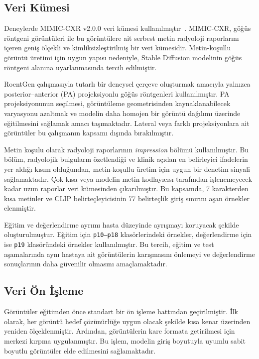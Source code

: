 \documentclass[11pt]{article}
\begin{document}
\subsection{Veri Kümesi}

Deneylerde MIMIC-CXR v2.0.0 veri kümesi kullanılmıştır~\cite{mimic}. MIMIC-CXR,
göğüs röntgeni görüntüleri ile bu görüntülere ait serbest metin radyoloji
raporlarını içeren geniş ölçekli ve kimliksizleştirilmiş bir veri kümesidir.
Metin-koşullu görüntü üretimi için uygun yapısı nedeniyle, Stable Diffusion
modelinin göğüs röntgeni alanına uyarlanmasında tercih edilmiştir.

RoentGen çalışmasıyla tutarlı bir deneysel çerçeve oluşturmak amacıyla yalnızca
posterior--anterior (PA) projeksiyonlu göğüs röntgenleri kullanılmıştır. PA
projeksiyonunun seçilmesi, görüntüleme geometrisinden kaynaklanabilecek
varyasyonu azaltmak ve modelin daha homojen bir görüntü dağılımı üzerinde
eğitilmesini sağlamak amacı taşımaktadır. Lateral veya farklı projeksiyonlara
ait görüntüler bu çalışmanın kapsamı dışında bırakılmıştır.

Metin koşulu olarak radyoloji raporlarının \emph{impression} bölümü
kullanılmıştır. Bu bölüm, radyolojik bulguların özetlendiği ve klinik açıdan
en belirleyici ifadelerin yer aldığı kısım olduğundan, metin-koşullu üretim
için uygun bir denetim sinyali sağlamaktadır. Çok kısa veya modelin metin
kodlayıcısı tarafından işlenemeyecek kadar uzun raporlar veri kümesinden
çıkarılmıştır. Bu kapsamda, 7 karakterden kısa metinler ve CLIP
belirteçleyicisinin 77 belirteçlik giriş sınırını aşan örnekler elenmiştir.

Eğitim ve değerlendirme ayrımı hasta düzeyinde ayrışmayı koruyacak şekilde
oluşturulmuştur. Eğitim için \texttt{p10--p18} klasörlerindeki örnekler,
değerlendirme için ise \texttt{p19} klasöründeki örnekler kullanılmıştır.
Bu tercih, eğitim ve test aşamalarında aynı hastaya ait görüntülerin
karışmasını önlemeyi ve değerlendirme sonuçlarının daha güvenilir olmasını
amaçlamaktadır.

\subsection{Veri Ön İşleme}

Görüntüler eğitimden önce standart bir ön işleme hattından geçirilmiştir. İlk
olarak, her görüntü hedef çözünürlüğe uygun olacak şekilde kısa kenar üzerinden
yeniden ölçeklenmiştir. Ardından, görüntülerin kare formata getirilmesi için
merkezi kırpma uygulanmıştır. Bu işlem, modelin giriş boyutuyla uyumlu
sabit boyutlu görüntüler elde edilmesini sağlamaktadır.
\end{document}
